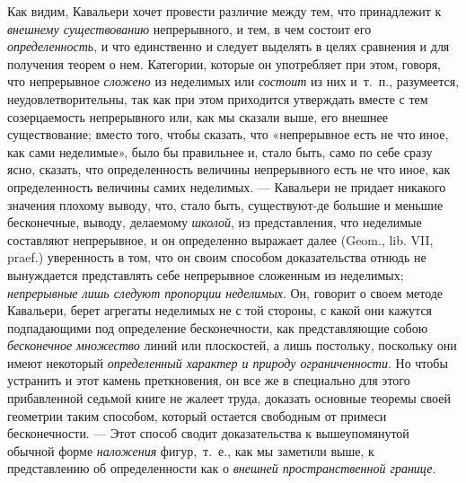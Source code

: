 {Как видим, Кавальери хочет провести различие между тем, что принадлежит к
{\em внешнему существованию} непрерывного, и тем, в чем
состоит его {\em определенность}, и что единственно и
следует выделять в целях сравнения и для получения теорем о нем. Категории,
которые он употребляет при этом, говоря, что непрерывное
{\em сложено} из неделимых или
{\em состоит} из них и~т.~п., разумеется,
неудовлетворительны, так как при этом приходится утверждать вместе с тем
созерцаемость непрерывного или, как мы сказали выше, его внешнее
существование; вместо того, чтобы сказать, что «непрерывное есть не что
иное, как сами неделимые», было бы правильнее и, стало быть, само по себе
сразу ясно, сказать, что определенность величины непрерывного есть не что
иное, как определенность величины самих неделимых. — Кавальери не придает
никакого значения плохому выводу, что, стало быть, существуют-де большие и
меньшие бесконечные, выводу, делаемому {\em школой}, из
представления, что неделимые составляют непрерывное, и он определенно
выражает далее (Geom., lib. VII, praef.) уверенность в том, что он своим
способом доказательства отнюдь не вынуждается представлять себе непрерывное
сложенным из неделимых; {\em непрерывные лишь следуют
пропорции неделимых}. Он, говорит о своем методе Кавальери, берет агрегаты
неделимых не с той стороны, с какой они кажутся подпадающими под
определение бесконечности, как представляющие собою
{\em бесконечное множество} линий или плоскостей, а
лишь постольку, поскольку они имеют некоторый
{\em определенный характер и природу ограниченности}.
Но чтобы устранить и этот камень преткновения, он все же в специально для
этого прибавленной седьмой книге не жалеет труда, доказать основные теоремы
своей геометрии таким способом, который остается свободным от примеси
бесконечности. — Этот способ сводит доказательства к вышеупомянутой обычной
форме {\em наложения} фигур,~т.~е., как мы заметили
выше, к представлению об определенности как о
{\em внешней пространственной границе}.

}
